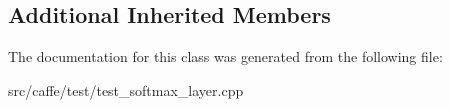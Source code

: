 \subsection*{Additional Inherited Members}


The documentation for this class was generated from the following file\+:\begin{DoxyCompactItemize}
\item 
src/caffe/test/test\+\_\+softmax\+\_\+layer.\+cpp\end{DoxyCompactItemize}
